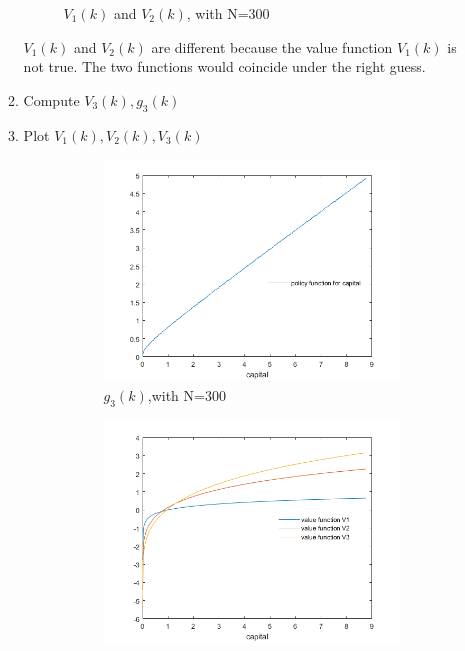 \documentclass{article}
\begin{document}
\begin{enumerate}
\begin{enumerate}
\begin{figure}[h!]
                \caption{$V_1(k)$ and $V_2(k)$, with N=300}
            \end{figure}
            $V_1(k)$ and $V_2(k)$ are different because the value function $V_1(k)$ is not true. The two functions would coincide under the right guess.
            \item Compute $V_3(k),g_3(k)$
            \item Plot $V_1(k),V_2(k),V_3(k)$
            \begin{figure}[h!]
                \begin{subfigure}[b]{.55\linewidth}
                    \includegraphics[width=\linewidth]{6_1f.png}
                    \caption{$g_3(k)$,with N=300}
                \end{subfigure}
                \begin{subfigure}[b]{.55\linewidth}
                    \includegraphics[width=\linewidth]{6_1g.png}

\end{subfigure}
\end{figure}
\end{enumerate}
\end{enumerate}
\end{document}
